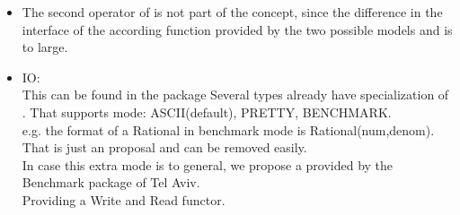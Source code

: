 \begin{itemize}
\item The second operator of  is not 
        part of the concept, since the difference in the interface of the 
        according function provided by the two possible models 
        and  is to large.  

\item IO:   \\
      This can be found in the package 
      Several types already have specialization of . 
      That supports mode: ASCII(default), PRETTY, BENCHMARK.\\
        e.g. the format of a Rational in benchmark mode is 
        Rational(num,denom).\\
      That is just an proposal and can be removed easily.  \\
        In case this extra mode is to general, we propose a  
        provided by the Benchmark package of Tel Aviv. \\
        Providing a Write and Read functor.  

\end{itemize}


